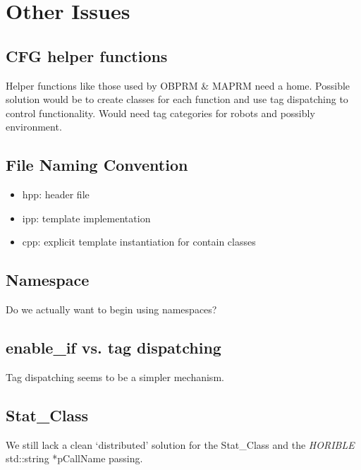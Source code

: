 \section{Other Issues}
\subsection{CFG helper functions}
Helper functions like those used by OBPRM \& MAPRM need a home.  Possible 
solution would be to create classes for each function and use tag
dispatching to control functionality.  Would need tag categories for robots and possibly environment.

\subsection{File Naming Convention}
\begin{itemize}
    \item hpp: header file
    \item ipp: template implementation
    \item cpp: explicit template instantiation for contain classes
\end{itemize}

\subsection{Namespace}
Do we actually want to begin using namespaces?

\subsection{enable\_if vs. tag dispatching}
Tag dispatching seems to be a simpler mechanism.

\subsection{Stat\_Class}
We still lack a clean `distributed' solution for the Stat\_Class and the \emph{HORIBLE} std::string *pCallName passing.
